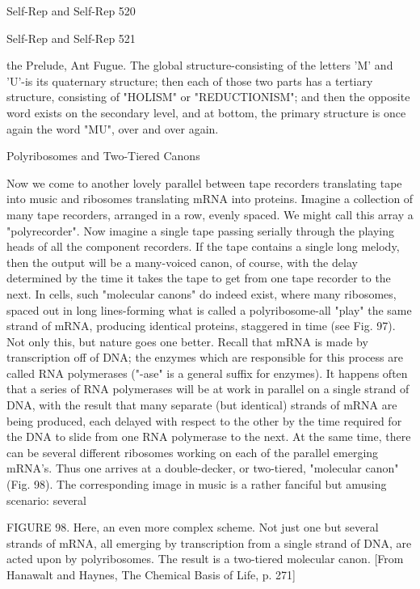 {Self-Rep and Self-Rep                                                                            520

Self-Rep and Self-Rep   521

the Prelude, Ant Fugue. The global structure-consisting of the letters 'M' and 'U'-is its
quaternary structure; then each of those two parts has a tertiary structure, consisting of
"HOLISM" or "REDUCTIONISM"; and then the opposite word exists on the secondary
level, and at bottom, the primary structure is once again the word "MU", over and over again.

                         Polyribosomes and Two-Tiered Canons

Now we come to another lovely parallel between tape recorders translating tape into music
and ribosomes translating mRNA into proteins. Imagine a collection of many tape recorders,
arranged in a row, evenly spaced. We might call this array a "polyrecorder". Now imagine a
single tape passing serially through the playing heads of all the component recorders. If the
tape contains a single long melody, then the output will be a many-voiced canon, of course,
with the delay determined by the time it takes the tape to get from one tape recorder to the
next. In cells, such "molecular canons" do indeed exist, where many ribosomes, spaced out in
long lines-forming what is called a polyribosome-all "play" the same strand of mRNA,
producing identical proteins, staggered in time (see Fig. 97).
        Not only this, but nature goes one better. Recall that mRNA is made by transcription
off of DNA; the enzymes which are responsible for this process are called RNA polymerases
("-ase" is a general suffix for enzymes). It happens often that a series of RNA polymerases
will be at work in parallel on a single strand of DNA, with the result that many separate (but
identical) strands of mRNA are being produced, each delayed with respect to the other by the
time required for the DNA to slide from one RNA polymerase to the next. At the same time,
there can be several different ribosomes working on each of the parallel emerging mRNA's.
Thus one arrives at a double-decker, or two-tiered, "molecular canon" (Fig. 98). The
corresponding image in music is a rather fanciful but amusing scenario: several

FIGURE 98. Here, an even more complex scheme. Not just one but several strands of
mRNA, all emerging by transcription from a single strand of DNA, are acted upon by
polyribosomes. The result is a two-tiered molecular canon. [From Hanawalt and Haynes, The
Chemical Basis of Life, p. 271]




}
